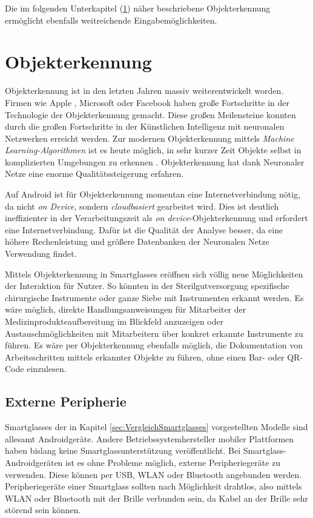 Die im folgenden Unterkapitel (\ref{sec:Objekterkennung}) näher beschriebene Objekterkennung ermöglicht ebenfalls weitreichende Eingabemöglichkeiten.
%
%
%
%
%
%
\section{Objekterkennung}
\label{sec:Objekterkennung}
Objekterkennung ist in den letzten Jahren massiv weiterentwickelt worden. Firmen wie Apple \cite{Apple2018b}, Microsoft \cite{Girshick2015} oder Facebook \cite{Schroepfer2015} haben große Fortschritte in der Technologie der Objekterkennung gemacht. Diese großen Meilensteine konnten durch die großen Fortschritte in der Künstlichen Intelligenz mit neuronalen Netzwerken \cite{Apple2018b, Schroepfer2015} erreicht werden. Zur modernen Objekterkennung mittels \emph{Machine Learning-Algorithmen} ist es heute möglich, in sehr kurzer Zeit Objekte selbst in komplizierten Umgebungen zu erkennen \cite{Schroepfer2015}. 
Objekterkennung hat dank Neuronaler Netze eine enorme Qualitätssteigerung erfahren.

Auf Android ist für Objekterkennung momentan eine Internetverbindung nötig, da nicht \emph{on Device}, sondern \emph{cloudbasiert} gearbeitet wird. Dies ist deutlich ineffizienter in der Verarbeitungszeit als \emph{on device}-Objekterkennung und erfordert eine Internetverbindung. Dafür ist die Qualität der Analyse besser, da eine höhere Rechenleistung und größere Datenbanken der Neuronalen Netze Verwendung findet.

Mittels Objekterkennung in Smartglasses eröffnen sich völlig neue Möglichkeiten der Interaktion für Nutzer. So könnten in der Sterilgutversorgung spezifische chirurgische Instrumente oder ganze Siebe mit Instrumenten erkannt werden. Es wäre möglich, direkte Handlungsanweisungen für Mitarbeiter der Medizinprodukteaufbereitung im Blickfeld anzuzeigen oder Austauschmöglichkeiten mit Mitarbeitern über konkret erkannte Instrumente zu führen. Es wäre per Objekterkennung ebenfalls möglich, die Dokumentation von Arbeitsschritten mittels erkannter Objekte zu führen, ohne einen Bar- oder QR-Code einzulesen.
%
%
%
%
%
%
\subsection{Externe Peripherie}
\label{sec:Externe_Peripherie}
Smartglasses der in Kapitel \ref{sec:VergleichSmartglasses} vorgestellten Modelle sind allesamt Androidgeräte. Andere Betriebssystemhersteller mobiler Plattformen haben bislang keine Smartglassunterstützung veröffentlicht. Bei Smartglass-Androidgeräten ist es ohne Probleme möglich, externe Peripheriegeräte zu verwenden. Diese können per USB, WLAN oder Bluetooth angebunden werden. Peripheriegeräte einer Smartglass sollten nach Möglichkeit drahtlos, also mittels WLAN oder Bluetooth mit der Brille verbunden sein, da Kabel an der Brille sehr störend sein können. 

